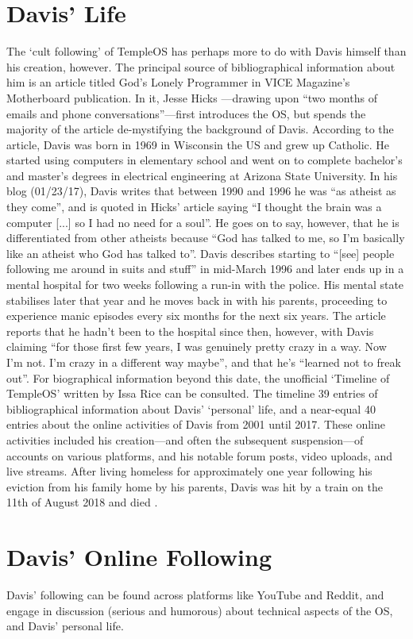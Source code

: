\documentclass{article}
\begin{document}
\section*{Davis' Life}
The `cult following' of TempleOS has perhaps
more to do with Davis himself than his creation, however.
The principal source of bibliographical information about him is
an article titled God’s Lonely Programmer
in VICE Magazine’s Motherboard publication.
In it, Jesse Hicks \parencite*{Hicks14}---drawing
upon ``two months of emails and phone conversations''---first
introduces the OS,
but spends the majority of the article de-mystifying the background of Davis.
According to the article,
Davis was born in 1969 in Wisconsin the US and grew up Catholic.
He started using computers in elementary school
and went on to complete bachelor's and master's degrees
in electrical engineering at Arizona State University.
In his blog (01/23/17), Davis writes that
between 1990 and 1996 he was ``as atheist as they come'',
and is quoted in Hicks' article saying
``I thought the brain was a computer [...] so I had no need for a soul''.
He goes on to say, however, that he is differentiated from other atheists
because ``God has talked to me,
so I'm basically like an atheist who God has talked to''.
Davis describes starting to
``[see] people following me around in suits and stuff'' in mid-March 1996
and later ends up in a mental hospital for two weeks
following a run-in with the police.
His mental state stabilises later that year
and he moves back in with his parents,
proceeding to experience manic episodes every six months for the next six years.
The article reports that he hadn't been to the hospital since then, however,
with Davis claiming
``for those first few years, I was genuinely pretty crazy in a way.
Now I'm not. I'm crazy in a different way maybe'',
and that he's ``learned not to freak out''.
For biographical information beyond this date,
the unofficial `Timeline of TempleOS' written by Issa Rice
\parencite*{Rice18} can be consulted.
The timeline 39 entries of bibliographical information
about Davis' `personal' life, and a near-equal 40 entries about
the online activities of Davis from 2001 until 2017.
These online activities included his creation---and
often the subsequent suspension---of accounts on various platforms,
and his notable forum posts, video uploads, and live streams.
After living homeless for approximately one year following
his eviction from his family home by his parents,
Davis was hit by a train on the 11th of August 2018 and died \parencite{Cecil18}.

\section*{Davis' Online Following}
Davis' following can be found across platforms like YouTube and Reddit,
and engage in discussion (serious and humorous) about
technical aspects of the OS, and Davis’ personal life.
\end{document}
